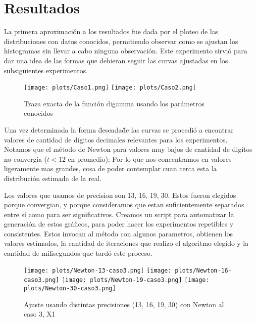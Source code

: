 \section{Resultados}


La primera aproximaci\'on a los resultados fue dada por el ploteo de las distribuciones con datos conocidos, permitiendo observar como se ajustan los histogramas sin llevar a cabo ninguna observaci\'on. Este experimento sirvi\'o para dar una idea de las formas que debieran seguir las curvas ajustadas en los subsiguientes experimentos.

\begin{figure} [H]
\begin {center}
\texttt{[image: plots/Caso1.png]}
\texttt{[image: plots/Caso2.png]}
\end {center}
\caption{Traza exacta de la funci\'on digamma usando los par\'ametros conocidos}
\label{fig:FitCaso3Newton}
\end{figure}

Una vez determinada la forma \"deseada\" de las curvas se procedi\'o a encontrar valores de cantidad de d\'igitos decimales relevantes para los experimentos. Notamos que el m\'etodo de Newton para valores muy bajos de cantidad de digitos no convergia ($t < 12$ en promedio); Por lo que nos concentramos en valores
ligeramente mas grandes, cosa de poder contemplar cuan cerca esta la distribuci\'on estimada de la real.

Los valores que usamos de precision son 13, 16, 19, 30. Estos fueron elegidos porque convergian, y porque consideramos que estan
suficientemente separados entre s\'i como para ser significativos. Creamos un script para automatizar la generaci\'on de estos gr\'aficos,
para poder hacer los experimentos repetibles y consistentes. Estos invocan al m\'etodo con algunos parametros, obtienen los
valores estimados, la cantidad de iteraciones que realizo el algoritmo elegido y la cantidad de milisegundos que tard\'o este proceso.


\begin{figure} [H]

\texttt{[image: plots/Newton-13-caso3.png]}
\texttt{[image: plots/Newton-16-caso3.png]}
\texttt{[image: plots/Newton-19-caso3.png]}
\texttt{[image: plots/Newton-30-caso3.png]}

\caption{Ajuste usando distintas precisiones (13, 16, 19, 30) con Newton al caso 3, X1}
\label{fig:FitCaso3Newton}
\end{figure}

